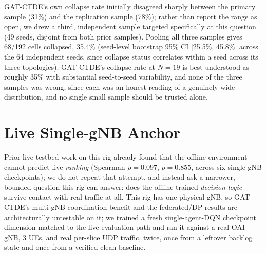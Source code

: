 \documentclass[pdflatex,sn-basic,Numbered]{sn-jnl}%
\begin{document}
GAT-CTDE's own collapse rate initially disagreed sharply between the
primary sample (31\%) and the replication sample (78\%); rather than
report the range as open, we drew a third, independent sample targeted
specifically at this question (49 seeds, disjoint from both prior
samples). Pooling all three samples gives 68/192 cells collapsed, 35.4\% (seed-level bootstrap 95\% CI [25.5\%, 45.8\%] across the 64 independent seeds, since collapse status correlates within a seed across its three topologies). GAT-CTDE's collapse rate at $N=19$ is best understood as roughly 35\% with substantial seed-to-seed variability, and none of the three samples was wrong, since each was an honest reading of a genuinely wide distribution, and no single small sample should be trusted alone.

\section{Live Single-gNB Anchor}
\label{sec:results-m8}
Prior live-testbed work on this rig already found that the offline
environment cannot predict live \emph{ranking} (Spearman
$\rho=0.097$, $p=0.855$, across six single-gNB checkpoints); we do not
repeat that attempt, and instead ask a narrower, bounded question this
rig can answer: does the offline-trained \emph{decision logic} survive
contact with real traffic at all. This rig has one physical gNB, so
GAT-CTDE's multi-gNB coordination benefit and the federated/DP results
are architecturally untestable on it; we trained a fresh single-agent-DQN checkpoint dimension-matched to the live evaluation path and ran it against a real OAI gNB, 3 UEs, and real per-slice UDP traffic, twice, once from a leftover backlog state and once from a verified-clean baseline.
\end{document}
